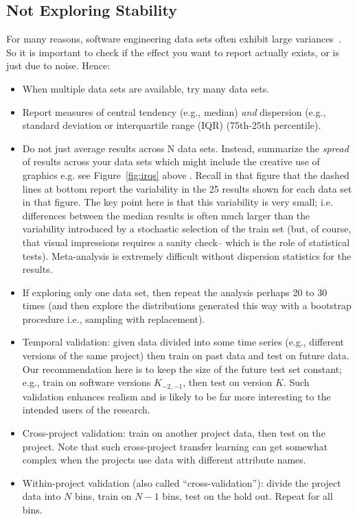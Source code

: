 \documentclass[preprint,10pt]{elsarticle}
\newcommand{\RED}{\color{red}}
\newcommand{\BLACK}{\color{black}}
\begin{document}
\subsection{Not Exploring Stability}

For many reasons, software engineering data sets often exhibit large variances~\cite{menzies12}. So it is important to check if the effect you want to report actually exists, or is just due to noise. Hence:

\begin{itemize}
\item When multiple data sets are available, try many data sets.
\item Report measures of central tendency (e.g., median) \textit{and} dispersion (e.g., standard deviation or interquartile range (IQR) (75th-25th percentile).
\item Do not just average results across N data sets. Instead, summarize the \textit{spread} of results across your data sets which might include the creative use of graphics e.g. 
\RED see Figure~\ref{fig:irqs} above \BLACK. Recall
in that figure that the dashed lines at bottom
report the variability in the 25 results shown for each
data set in that figure. The key point here is that this
variability is very small; i.e.  differences between the median results is often much larger than the variability introduced by a stochastic selection of the train set (but, of course, that visual impressions requires a sanity check-- which is the role of 
statistical tests). Meta-analysis is extremely difficult without dispersion statistics for the results.
\item If exploring only one data set, then repeat the analysis perhaps 20 to 30 times (and then explore the distributions generated this way with a bootstrap procedure i.e., sampling with replacement). %
\item Temporal validation: given data divided into some time series (e.g., different versions of the same project) then train on past data and test on future data. Our recommendation here is to keep the size of the future test set constant; e.g., train on software versions $K_{-2,-1}$, then test on version $K$.  Such validation enhances realism and is likely to be far more interesting to the intended users of the research.
\item Cross-project validation: train on another project data, then test on the project. Note that such cross-project transfer learning can get somewhat complex when the projects use data with different attribute names.
\item Within-project validation (also called ``cross-validation''): divide the project data into $N$ bins, train on $N-1$ bins, test on the hold out. Repeat for all bins.  
\end{itemize}
\end{document}
